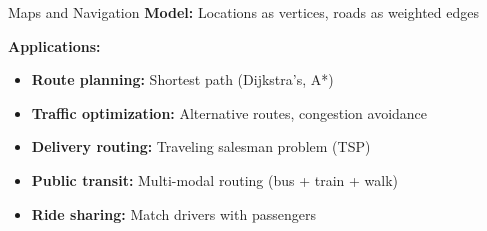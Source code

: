 \documentclass[aspectratio=169]{beamer}
\begin{document}
\begin{frame}{Maps and Navigation}
  \textbf{Model:} Locations as vertices, roads as weighted edges

  \vspace{0.3cm}
  \begin{center}
  \end{center}

  \vspace{0.3cm}
  \textbf{Applications:}
  \begin{itemize}
    \item \textbf{Route planning:} Shortest path (Dijkstra's, A*)
    \item \textbf{Traffic optimization:} Alternative routes, congestion avoidance
    \item \textbf{Delivery routing:} Traveling salesman problem (TSP)
    \item \textbf{Public transit:} Multi-modal routing (bus + train + walk)
    \item \textbf{Ride sharing:} Match drivers with passengers
  \end{itemize}
\end{frame}
\end{document}
